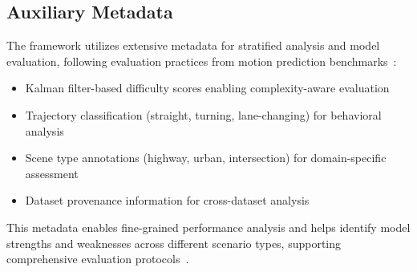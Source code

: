 \subsection{Auxiliary Metadata}
\label{ssec:auxiliary_metadata}

The framework utilizes extensive metadata for stratified analysis and model evaluation, following evaluation practices from motion prediction benchmarks~\cite{WOMD2021, av2Wilson2023}:
\begin{itemize}
    \item Kalman filter-based difficulty scores enabling complexity-aware evaluation
    \item Trajectory classification (straight, turning, lane-changing) for behavioral analysis
    \item Scene type annotations (highway, urban, intersection) for domain-specific assessment
    \item Dataset provenance information for cross-dataset analysis
\end{itemize}

This metadata enables fine-grained performance analysis and helps identify model strengths and weaknesses across different scenario types, supporting comprehensive evaluation protocols~\cite{unitrajFeng2024}.
